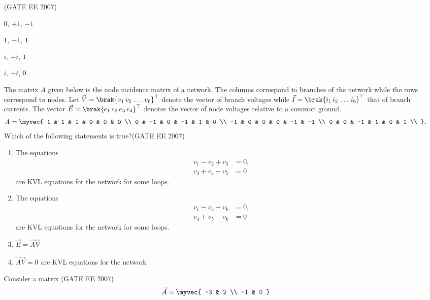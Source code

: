 \hfill{(GATE EE 2007)} 
\begin{enumerate}
\begin{multicols}{4}
    \item $0$, $+1$, $-1$
    \item $1$, $-1$, $1$
    \item $i$, $-i$, $1$
    \item $i$, $-i$, $0$
    \end{multicols}
\end{enumerate}
%
\item  
The matrix $A$ given below is the node incidence matrix of a network. The columns correspond to branches of the network while the rows correspond to nodes. Let $\vec{V} = \brak{v_1\, v_2\, \ldots\, v_6}^{\top}$ denote the vector of branch voltages while $\vec{I} = \brak{i_1\, i_2\, \ldots\, i_6}^{\top}$ that of branch currents. The vector $\vec{E} = \brak{e_1\, e_2\, e_3\, e_4}^{\top}$ denotes the vector of node voltages relative to a common ground.
$$ A =
\myvec{
1 & 1 & 1 & 0 & 0 & 0 \\
0 & -1 & 0 & -1 & 1 & 0 \\
-1 & 0 & 0 & 0 & -1 & -1 \\
0 & 0 & -1 & 1 & 0 & 1 \\
}.
$$
Which of the following statements is true?\hfill{(GATE EE 2007)}
\begin{enumerate}
    \item The equations
	    \begin{align*}
        v_1 - v_2 + v_3 &= 0, \\ v_3 + v_4 - v_5 &= 0
\end{align*}
        are KVL equations for the network for some loops.
    \item The equations
	    \begin{align*}
        v_1 - v_3 - v_6 &= 0, \\ v_4 + v_5 - v_6 &= 0
\end{align*}
        are KVL equations for the network for some loops.
    \item $\vec{E} = \vec{A}\vec{V}$
    \item $\vec{A}\vec{V} = 0$ are KVL equations for the network
\end{enumerate}
%
\item 
Consider a matrix
\hfill{(GATE EE 2007)}
$$
\vec{A} =
\myvec{
-3 & 2 \\
-1 & 0
}
$$
